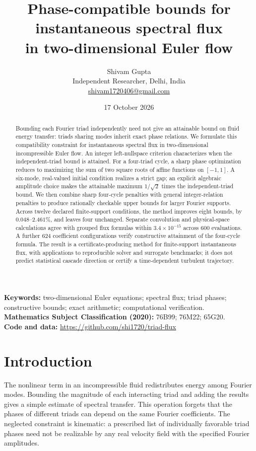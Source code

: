 \documentclass[11pt]{article}
\title{Phase-compatible bounds for instantaneous spectral flux\\in two-dimensional Euler flow}
\author{Shivam Gupta\\\small Independent Researcher, Delhi, India\\\small\href{mailto:shivam1720406@gmail.com}{shivam1720406@gmail.com}}
\date{17 October 2026}
\begin{document}
\maketitle
\begin{abstract}
Bounding each Fourier triad independently need not give an attainable bound on fluid energy transfer: triads sharing modes inherit exact phase relations. We formulate this compatibility constraint for instantaneous spectral flux in two-dimensional incompressible Euler flow. An integer left-nullspace criterion characterizes when the independent-triad bound is attained. For a four-triad cycle, a sharp phase optimization reduces to maximizing the sum of two square roots of affine functions on $[-1,1]$. A six-mode, real-valued initial condition realizes a strict gap; an explicit algebraic amplitude choice makes the attainable maximum $1/\sqrt2$ times the independent-triad bound. We then combine sharp four-cycle penalties with general integer-relation penalties to produce rationally checkable upper bounds for larger Fourier supports. Across twelve declared finite-support conditions, the method improves eight bounds, by $0.048$--$2.461\%$, and leaves four unchanged. Separate convolution and physical-space calculations agree with grouped flux formulas within $3.4\times10^{-15}$ across 600 evaluations. A further 624 coefficient configurations verify constructive attainment of the four-cycle formula. The result is a certificate-producing method for finite-support instantaneous flux, with applications to reproducible solver and surrogate benchmarks; it does not predict statistical cascade direction or certify a time-dependent turbulent trajectory.
\end{abstract}
\noindent\textbf{Keywords:} two-dimensional Euler equations; spectral flux; triad phases; constructive bounds; exact arithmetic; computational verification.\\
\textbf{Mathematics Subject Classification (2020):} 76B99; 76M22; 65G20.\\
\textbf{Code and data:} \url{https://github.com/shi1720/triad-flux}

\section{Introduction}
The nonlinear term in an incompressible fluid redistributes energy among Fourier modes. Bounding the magnitude of each interacting triad and adding the results gives a simple estimate of spectral transfer. This operation forgets that the phases of different triads can depend on the same Fourier coefficients. The neglected constraint is kinematic: a prescribed list of individually favorable triad phases need not be realizable by any real velocity field with the specified Fourier amplitudes.
\end{document}
